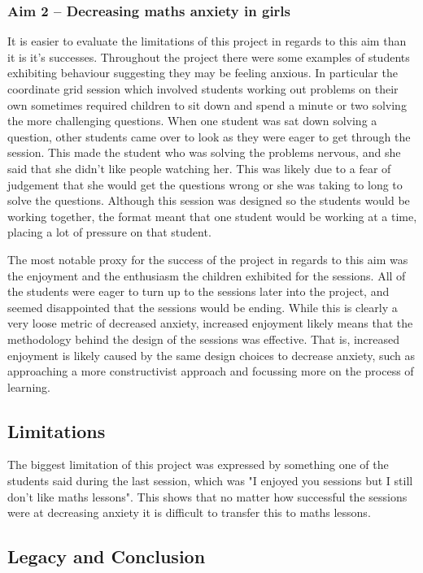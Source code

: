 \documentclass[11pt, a4paper, notitlepage]{article}
\begin{document}
\subsubsection*{Aim 2 -- Decreasing maths anxiety in girls}
It is easier to evaluate the limitations of this project in regards to this aim than it is it's successes. Throughout the project there were some examples of students exhibiting behaviour suggesting they may be feeling anxious. In particular the coordinate grid session which involved students working out problems on their own sometimes required children to sit down and spend a minute or two solving the more challenging questions. When one student was sat down solving a question, other students came over to look as they were eager to get through the session. This made the student who was solving the problems nervous, and she said that she didn't like people watching her. This was likely due to a fear of judgement that she would get the questions wrong or she was taking to long to solve the questions. Although this session was designed so the students would be working together, the format meant that one student would be working at a time, placing a lot of pressure on that student. 
\par
The most notable proxy for the success of the project in regards to this aim was the enjoyment and the enthusiasm the children exhibited for the sessions. All of the students were eager to turn up to the sessions later into the project, and seemed disappointed that the sessions would be ending. While this is clearly a very loose metric of decreased anxiety, increased enjoyment likely means that the methodology behind the design of the sessions was effective. That is, increased enjoyment is likely caused by the same design choices to decrease anxiety, such as approaching a more constructivist approach and focussing more on the process of learning.

\subsection{Limitations}
The biggest limitation of this project was expressed by something one of the students said during the last session, which was "I enjoyed you sessions but I still don't like maths lessons". This shows that no matter how successful the sessions were at decreasing anxiety it is difficult to transfer this to maths lessons.


\subsection{Legacy and Conclusion}
\end{document}
